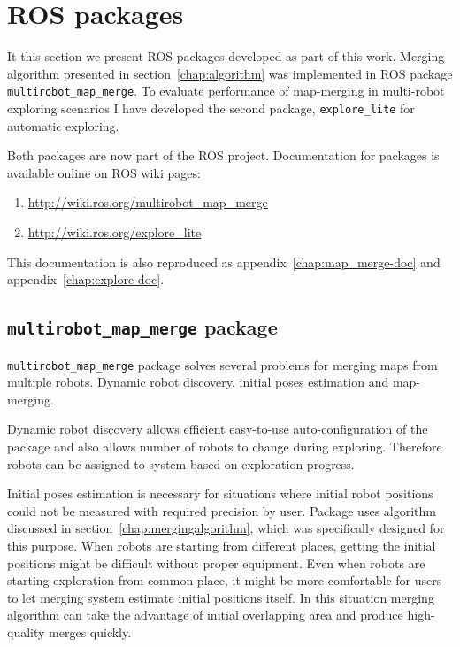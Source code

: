 \chapter{ROS packages}
\label{chap:ros-packages}

It this section we present \gls{ROS} packages developed as part of this work. Merging algorithm presented in section~\ref{chap:algorithm} was implemented in \gls{ROS} package \texttt{multirobot\_map\_merge}. To evaluate performance of map-merging in multi-robot exploring scenarios I have developed the second package, \texttt{explore\_lite} for automatic exploring.

Both packages are now part of the \gls{ROS} project. Documentation for packages is available online on \gls{ROS} wiki pages:

\begin{enumerate}
	\item \url{http://wiki.ros.org/multirobot_map_merge}
	\item \url{http://wiki.ros.org/explore_lite}
\end{enumerate}

This documentation is also reproduced as appendix~\ref{chap:map_merge-doc} and appendix~\ref{chap:explore-doc}.

\section{\texttt{multirobot\_map\_merge} package} %
\label{sec:map_merge-package}

\texttt{multirobot\_map\_merge} package solves several problems for merging maps from multiple robots. Dynamic robot discovery, initial poses estimation and map-merging.

Dynamic robot discovery allows efficient easy-to-use auto-configuration of the package and also allows number of robots to change during exploring. Therefore robots can be assigned to system based on exploration progress.

Initial poses estimation is necessary for situations where initial robot positions could not be measured with required precision by user. Package uses algorithm discussed in section~\ref{chap:mergingalgorithm}, which was specifically designed for this purpose. When robots are starting from different places, getting the initial positions might be difficult without proper equipment. Even when robots are starting exploration from common place, it might be more comfortable for users to let merging system estimate initial positions itself. In this situation merging algorithm can take the advantage of initial overlapping area and produce high-quality merges quickly.

